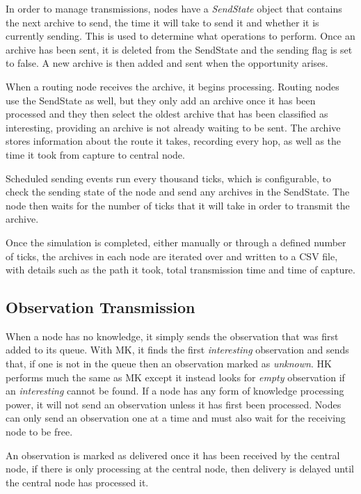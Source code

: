 	In order to manage transmissions, nodes have a \textit{SendState} object that contains the next archive to send, the time it will take to send it and whether it is currently sending. This is used to determine what operations to perform. Once an archive has been sent, it is deleted from the SendState and the sending flag is set to false. A new archive is then added and sent when the opportunity arises.
	
	When a routing node receives the archive, it begins processing. Routing nodes use the SendState as well, but they only add an archive once it has been processed and they then select the oldest archive that has been classified as interesting, providing an archive is not already waiting to be sent. The archive stores information about the route it takes, recording every hop, as well as the time it took from capture to central node.
	
	Scheduled sending events run every thousand ticks, which is configurable, to check the sending state of the node and send any archives in the SendState. The node then waits for the number of ticks that it will take in order to transmit the archive.
	
	Once the simulation is completed, either manually or through a defined number of ticks, the archives in each node are iterated over and written to a CSV file, with details such as the path it took, total transmission time and time of capture.

\subsection{Observation Transmission}
When a node has no knowledge, it simply sends the observation that was first added to its queue. With MK, it finds the first \textit{interesting} observation and sends that, if one is not in the queue then an observation marked as \textit{unknown}. HK performs much the same as MK except it instead looks for \textit{empty} observation if an \textit{interesting} cannot be found. If a node has any form of knowledge processing power, it will not send an observation unless it has first been processed. Nodes can only send an observation one at a time and must also wait for the receiving node to be free.

An observation is marked as delivered once it has been received by the central node, if there is only processing at the central node, then delivery is delayed until the central node has processed it.


